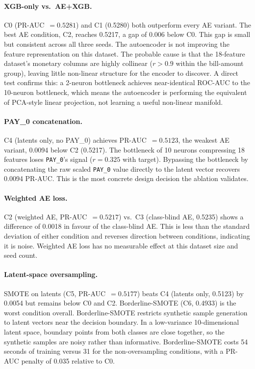 \documentclass[12pt,a4paper]{article}
\begin{document}
\paragraph{XGB-only vs.\ AE+XGB.}
C0 (PR-AUC~$= 0.5281$) and C1 (0.5280) both outperform every AE variant.
The best AE condition, C2, reaches 0.5217, a gap of 0.006 below C0. This
gap is small but consistent across all three seeds. The autoencoder is not
improving the feature representation on this dataset. The probable cause is
that the 18-feature dataset's monetary columns are highly collinear ($r > 0.9$
within the bill-amount group), leaving little non-linear structure for the
encoder to discover. A direct test confirms this: a 2-neuron bottleneck
achieves near-identical ROC-AUC to the 10-neuron bottleneck, which means
the autoencoder is performing the equivalent of PCA-style linear projection,
not learning a useful non-linear manifold.

\paragraph{PAY\_0 concatenation.}
C4 (latents only, no PAY\_0) achieves PR-AUC~$= 0.5123$, the weakest AE
variant, 0.0094 below C2 (0.5217). The bottleneck of 10 neurons compressing
18 features loses \texttt{PAY\_0}'s signal ($r = 0.325$ with target). Bypassing
the bottleneck by concatenating the raw scaled \texttt{PAY\_0} value directly
to the latent vector recovers 0.0094 PR-AUC. This is the most concrete
design decision the ablation validates.

\paragraph{Weighted AE loss.}
C2 (weighted AE, PR-AUC~$= 0.5217$) vs.\ C3 (class-blind AE, 0.5235) shows
a difference of 0.0018 in favour of the class-blind AE. This is less than the
standard deviation of either condition and reverses direction between conditions,
indicating it is noise. Weighted AE loss has no measurable effect at this dataset
size and seed count.

\paragraph{Latent-space oversampling.}
SMOTE on latents (C5, PR-AUC~$= 0.5177$) beats C4 (latents only, 0.5123)
by 0.0054 but remains below C0 and C2. Borderline-SMOTE (C6, 0.4933)
is the worst condition overall. Borderline-SMOTE restricts synthetic sample
generation to latent vectors near the decision boundary. In a low-variance
10-dimensional latent space, boundary points from both classes are close
together, so the synthetic samples are noisy rather than informative.
Borderline-SMOTE costs 54 seconds of training versus 31 for the non-oversampling
conditions, with a PR-AUC penalty of 0.035 relative to C0.
\end{document}
